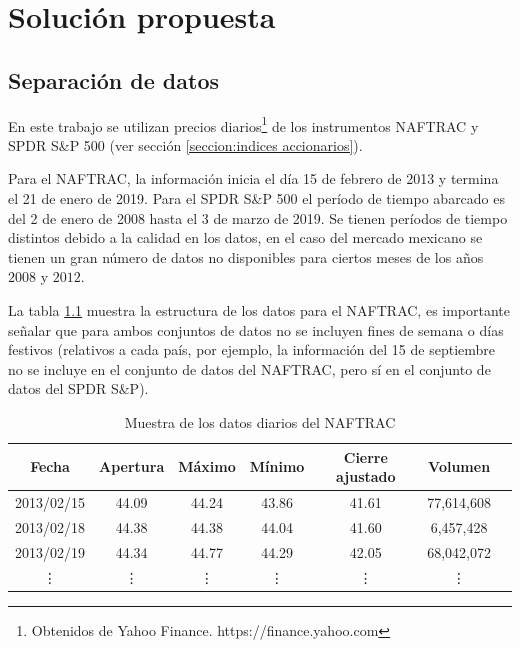 \documentclass[12pt]{report}
\theoremstyle{break}
\theoremstyle{break}
\begin{document}
\chapter[Capítulo \thechapter: Solución propuesta]{Solución propuesta}
\label{capitulo:solucion propuesta}

\section{Separación de datos}
\label{seccion:separacion de datos}
En este trabajo se utilizan precios diarios\footnote{Obtenidos de Yahoo Finance. https://finance.yahoo.com} de los instrumentos NAFTRAC y SPDR S\&P 500 (ver sección \ref{seccion:indices accionarios}).

Para el NAFTRAC, la información inicia el día 15 de febrero de 2013 y termina el 21 de enero de 2019. Para el SPDR S\&P 500 el período de tiempo abarcado es del 2 de enero de 2008 hasta  el 3 de marzo de 2019. Se tienen períodos de tiempo distintos debido a la calidad en los datos, en el caso del mercado mexicano se tienen un gran número de datos no disponibles para ciertos meses de los años $2008$ y $2012$.

La tabla \ref{tabla:Ejemplo datos diarios NAFTRAC} muestra la estructura de los datos para el NAFTRAC, es importante señalar que para ambos conjuntos de datos no se incluyen fines de semana o días festivos (relativos a cada país, por ejemplo, la información del 15 de septiembre no se incluye en el conjunto de datos del NAFTRAC, pero sí en el conjunto de datos del SPDR S\&P).

\begin{table}[h]
\centering
\begin{tabular}{ccccccc}
\hline
\textbf{Fecha} & \textbf{Apertura} & \textbf{Máximo} & \textbf{Mínimo} & \textbf{Cierre  ajustado} &  \textbf{Volumen} \\
\hline
2013/02/15 & 44.09 & 44.24 & 43.86  & 41.61 & 77,614,608\\
2013/02/18 & 44.38 & 44.38 & 44.04  & 41.60 & 6,457,428\\
2013/02/19 & 44.34 & 44.77 & 44.29  & 42.05 & 68,042,072\\
\vdots & \vdots & \vdots & \vdots  & \vdots & \vdots \\
\hline
\end{tabular}
\caption{\label{tabla:Ejemplo datos diarios NAFTRAC} Muestra de los datos diarios del NAFTRAC}
\end{table}
\end{document}
